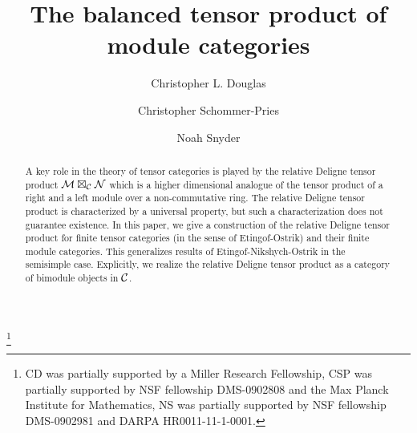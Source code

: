 \documentclass{amsart}
\begin{document}
\title{The balanced tensor product of module categories}

\begin{abstract}
A key role in the theory of tensor categories is played by the relative Deligne tensor product $\mathcal M \boxtimes_\mathcal C \mathcal N$ which is a higher dimensional analogue of the tensor product of a right and a left module over a non-commutative ring.  The relative Deligne tensor product is characterized by a universal property, but such a characterization does not guarantee existence.  In this paper, we give a construction of the relative Deligne tensor product for finite tensor categories (in the sense of Etingof-Ostrik) and their finite module categories.  This generalizes results of Etingof-Nikshych-Ostrik in the semisimple case.  Explicitly, we realize the relative Deligne tensor product as a category of bimodule objects in $\mathcal C$.
\end{abstract}

\author{Christopher L. Douglas}
\address{Mathematical Institute\\ University of Oxford\\ Oxford OX1 3LB\\ United Kingdom}
      	
\author{Christopher Schommer-Pries}
\address{Department of Mathematics\\ Max Planck Institute for Mathematics \\ 53111 Bonn \\ Germany}

\author{Noah Snyder}
\address{Department of Mathematics\\ Indiana University\\ Bloomington, IN 47401\\ USA}

\thanks{CD was partially supported by a Miller Research Fellowship, CSP was partially supported by NSF fellowship DMS-0902808 and the Max Planck Institute for Mathematics,  NS was partially supported by NSF fellowship DMS-0902981 and DARPA HR0011-11-1-0001.
}


\maketitle	
\end{document}
